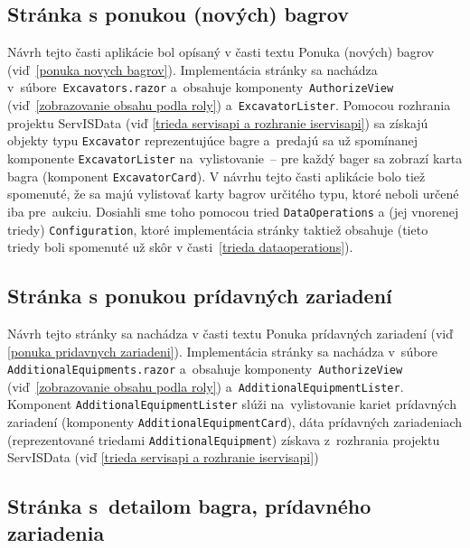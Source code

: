 \subsection{Stránka s ponukou (nových) bagrov}

Návrh tejto časti aplikácie bol opísaný v časti textu Ponuka (nových) bagrov (viď~\ref{ponuka novych bagrov}). Implementácia stránky sa nachádza v~súbore~\verb|Excavators.razor| a~obsahuje komponenty~\verb|AuthorizeView| (viď~\ref{zobrazovanie obsahu podla roly}) a~\verb|ExcavatorLister|. Pomocou rozhrania projektu ServISData (viď \ref{trieda servisapi a rozhranie iservisapi}) sa získajú objekty typu \verb|Excavator| reprezentujúce bagre a~predajú sa už spomínanej komponente \verb|ExcavatorLister| na~vylistovanie~-- pre každý bager sa zobrazí karta bagra (komponent \verb|ExcavatorCard|). V návrhu tejto časti aplikácie bolo tiež spomenuté, že sa majú vylistovať karty bagrov určitého typu, ktoré neboli určené iba pre~aukciu. Dosiahli sme toho pomocou tried \verb|DataOperations| a (jej vnorenej triedy) \verb|Configuration|, ktoré implementácia stránky taktiež obsahuje (tieto triedy boli spomenuté už skôr v časti~\ref{trieda dataoperations}).

\subsection{Stránka s ponukou prídavných zariadení}

Návrh tejto stránky sa nachádza v časti textu Ponuka prídavných zariadení (viď \ref{ponuka pridavnych zariadeni}). Implementácia stránky sa nachádza v~súbore \linebreak\verb|AdditionalEquipments.razor| a~obsahuje komponenty~\verb|AuthorizeView| (viď~\ref{zobrazovanie obsahu podla roly}) a~\verb|AdditionalEquipmentLister|. Komponent \linebreak\verb|AdditionalEquipmentLister| slúži na~vylistovanie kariet prídavných zariadení (komponenty \verb|AdditionalEquipmentCard|), dáta prídavných zariadeniach (reprezentované triedami \verb|AdditionalEquipment|) získava z~rozhrania projektu ServISData (viď \ref{trieda servisapi a rozhranie iservisapi})

\subsection{Stránka s~detailom bagra, prídavného zariadenia}

